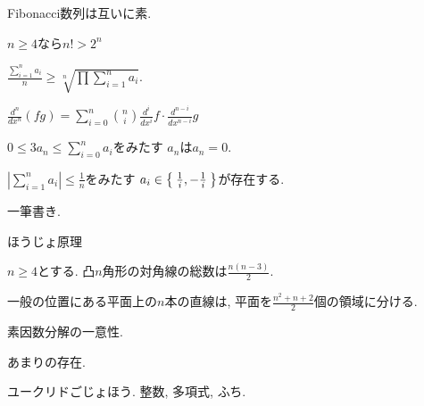\begin{prop}
  Fibonacci数列は互いに素.
\end{prop}



\begin{prop}
  $n\geq 4$なら$n!>2^n$
\end{prop}



\begin{prop}
  $\frac{\sum_{i=1}^n a_i}{n} \geq \sqrt[n]{\prod\sum_{i=1}^n a_i}$.
\end{prop}


\begin{prop}
$\frac{d^n}{dx^n}(fg)=\sum_{i=0}^n\binom{n}{i}\frac{d^i}{dx^i}f \cdot \frac{d^{n-i}}{dx^{n-i}}g$
\end{prop}




\begin{prop}
  $0\leq 3a_n\leq\sum_{i=0}^n a_i$をみたす
  $a_n$は$a_n=0$.
\end{prop}

\begin{prop}
  $|\sum_{i=1}^{n}a_i|\leq \frac{1}{n}$をみたす
  $a_i\in\Set{\frac{1}{i},-\frac{1}{i}}$が存在する.
\end{prop}

\begin{prop}
一筆書き.
\end{prop}

\begin{prop}
ほうじょ原理
\end{prop}

\begin{prop}
  $n\geq 4$とする.
  凸$n$角形の対角線の総数は$\frac{n(n-3)}{2}$.
\end{prop}

\begin{prop}
  一般の位置にある平面上の$n$本の直線は,
  平面を$\frac{n^2+n+2}{2}$個の領域に分ける.
\end{prop}

\begin{prop}
  素因数分解の一意性.
\end{prop}

\begin{prop}
  あまりの存在.
\end{prop}

\begin{prop}
  ユークリドごじょほう.  整数, 多項式, ふち.
\end{prop}

